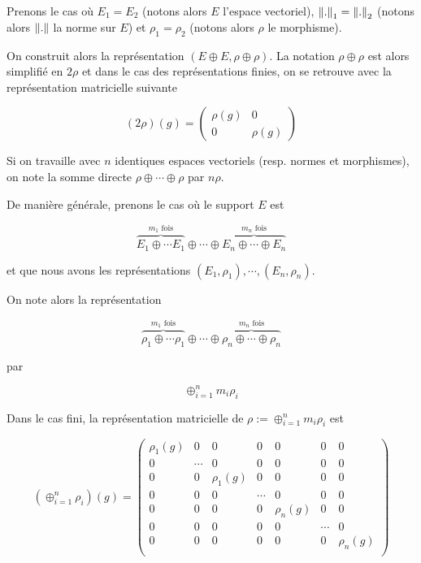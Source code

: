 Prenons le cas où $E_{1} = E_{2}$ (notons alors $E$ l'espace vectoriel),
$\norm{.}_{1} = \norm{.}_{2}$ (notons alors $\norm{.}$ la norme sur
$E$) et $\rho_{1} = \rho_{2}$ (notons alors $\rho$ le morphisme).

On construit alors la représentation $(E \oplus E, \rho
\oplus \rho)$.
La notation $\rho \oplus \rho$ est alors simplifié en $2 \rho$ et dans le cas
des représentations finies, on se retrouve avec la représentation matricielle
suivante

\begin{equation}
	(2 \rho)(g) =
	\begin{pmatrix}
		\rho(g)		& 0 \\
		0			& \rho(g)
	\end{pmatrix}
\end{equation}

Si on travaille avec $n$ identiques espaces vectoriels
(resp. normes et morphismes), on note la somme directe $\rho \oplus \cdots
\oplus \rho$ par $n \rho$.

De manière générale, prenons le cas où le support $E$ est

\begin{equation}
	\overbrace{E_{1} \oplus \cdots E_{1}}^{m_{1} \text{ fois}} \oplus \cdots
	\oplus \overbrace{E_{n} \oplus \cdots \oplus E_{n}}^{m_{n} \text{ fois}}
\end{equation}

et que nous avons les représentations $(E_{1}, \rho_{1}),
\cdots, (E_{n}, \rho_{n})$.

On note alors la représentation

\begin{equation}
	\overbrace{\rho_{1} \oplus \cdots \rho_{1}}^{m_{1} \text{ fois}} \oplus \cdots
	\oplus \overbrace{\rho_{n} \oplus \cdots \oplus \rho_{n}}^{m_{n} \text{ fois}}
\end{equation}

par

\begin{equation}
	\oplus_{i = 1}^{n} m_{i} \rho_{i}
\end{equation}

Dans le cas fini, la représentation matricielle de $\rho := \oplus_{i = 1}^{n}
m_{i} \rho_{i}$ est

\begin{equation}
	(\oplus_{i = 1}^{n} \rho_{i})(g) =
	\begin{pmatrix}
		\rho_{1}(g)		& 0			& 0			&	0			& 0				&
		0 & 0 \\
		0				& \cdots 	& 0				&	0		& 0				&
		0 & 0 \\
		0				& 0 		& \rho_{1}(g)	&	0		& 0				&
		0 & 0 \\
		0				& 0			& 0				&	\cdots	& 0				&
		0				& 0 \\
		0				& 0			& 0				&	0		& \rho_{n}(g)	&
		0				&	0 \\
		0				& 0			& 0				&	0		& 0				&
		\cdots 			& 0 \\
		0				& 0			& 0				&	0		& 0				&
		0				& \rho_{n}(g) \\
	\end{pmatrix}
\end{equation}

